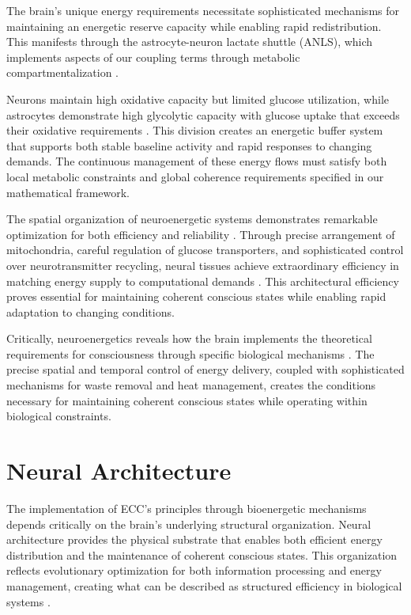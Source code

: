 \begin{refsection}
The brain's unique energy requirements necessitate sophisticated mechanisms for maintaining an energetic reserve capacity while enabling rapid redistribution. This manifests through the astrocyte-neuron lactate shuttle (ANLS), which implements aspects of our coupling terms through metabolic compartmentalization \cite{Pellerin2012}. 

Neurons maintain high oxidative capacity but limited glucose utilization, while astrocytes demonstrate high glycolytic capacity with glucose uptake that exceeds their oxidative requirements \cite{Magistretti2015}. This division creates an energetic buffer system that supports both stable baseline activity and rapid responses to changing demands. The continuous management of these energy flows must satisfy both local metabolic constraints and global coherence requirements specified in our mathematical framework.

The spatial organization of neuroenergetic systems demonstrates remarkable optimization for both efficiency and reliability \cite{Attwell2001}. Through precise arrangement of mitochondria, careful regulation of glucose transporters, and sophisticated control over neurotransmitter recycling, neural tissues achieve extraordinary efficiency in matching energy supply to computational demands \cite{Harris2012}. This architectural efficiency proves essential for maintaining coherent conscious states while enabling rapid adaptation to changing conditions.

Critically, neuroenergetics reveals how the brain implements the theoretical requirements for consciousness through specific biological mechanisms \cite{Hertz2007}. The precise spatial and temporal control of energy delivery, coupled with sophisticated mechanisms for waste removal and heat management, creates the conditions necessary for maintaining coherent conscious states while operating within biological constraints.

\section{Neural Architecture}

The implementation of ECC's principles through bioenergetic mechanisms depends critically on the brain's underlying structural organization. Neural architecture provides the physical substrate that enables both efficient energy distribution and the maintenance of coherent conscious states. This organization reflects evolutionary optimization for both information processing and energy management, creating what can be described as structured efficiency in biological systems \cite{Hilgetag2020}.


\end{refsection}
